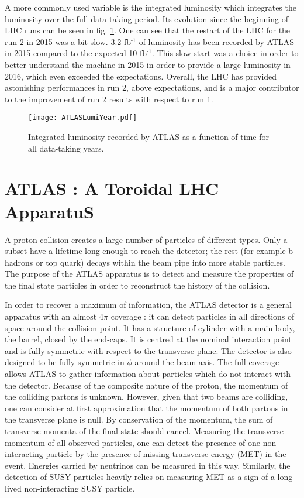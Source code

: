 A more commonly used variable is the integrated luminosity which integrates the luminosity over the full data-taking period.
Its evolution since the beginning of LHC runs can be seen in fig. \ref{fig:orgb783d32}.
One can see that the restart of the LHC for the run 2 in 2015 was a bit slow.
3.2 fb\(^{\text{-1}}\) of luminosity has been recorded by ATLAS in 2015 compared to the expected 10 fb\(^{\text{-1}}\).
This slow start was a choice in order to better understand the machine in 2015 in order to provide a large luminosity in 2016, which even exceeded the expectations.
Overall, the LHC has provided astonishing performances in run 2, above expectations, and is a major contributor to the improvement of run 2 results with respect to run 1.

\begin{figure}[htbp]
\centering
\texttt{[image: ATLASLumiYear.pdf]}
\caption{\label{fig:orgb783d32}
Integrated luminosity recorded by ATLAS as a function of time for all data-taking years.\cite{ATLASPublicLumiRun2}}
\end{figure}



\chapter{ATLAS : A Toroidal LHC ApparatuS}
\label{sec:org6b364c7}

A proton collision creates a large number of particles of different types.
Only a subset have a lifetime long enough to reach the detector; the rest (for example b hadrons or top quark) decays within the beam pipe into more stable particles.
The purpose of the ATLAS apparatus is to detect and measure the properties of the final state particles in order to reconstruct the history of the collision.

In order to recover a maximum of information, the ATLAS detector is a general apparatus with an almost 4\(\pi\) coverage : it can detect particles in all directions of space around the collision point.
It has a structure of cylinder with a main body, the barrel, closed by the end-caps.
It is centred at the nominal interaction point and is fully symmetric with respect to the transverse plane.
The detector is also designed to be fully symmetric in $\phi$ around the beam axis.
The full coverage allows ATLAS to gather information about particles which do not interact with the detector.
Because of the composite nature of the proton, the momentum of the colliding partons is unknown.
However, given that two beams are colliding, one can consider at first approximation that the momentum of both partons in the transverse plane is null.
By conservation of the momentum, the sum of transverse momenta of the final state should cancel.
Measuring the transverse momentum of all observed particles, one can detect the presence of one non-interacting particle by the presence of missing transverse energy (MET) in the event.
Energies carried by neutrinos can be measured in this way.
Similarly, the detection of SUSY particles heavily relies on measuring MET as a sign of a long lived non-interacting SUSY particle.


